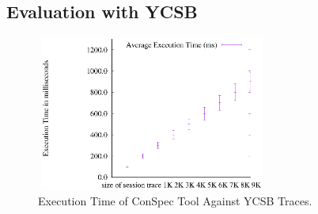 \documentclass[journal,compsoc]{IEEEtran}
\begin{document}
  \subsection{Evaluation with YCSB}\label{sec:evalycsb}
      \begin{figure}%
        \includegraphics[width=3in,height=2in]
                    {conspecYCSBvarhist.eps} %
        \caption{Execution Time of ConSpec Tool Against YCSB Traces.}
        \label{fig:examplefull}
\end{figure}
\end{document}

